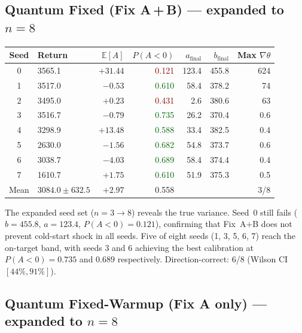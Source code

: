 \documentclass[10pt,a4paper]{article}
\begin{document}
\subsection{Quantum Fixed (Fix A\,+\,B) — expanded to $n=8$}

\begin{center}
\setlength{\tabcolsep}{5pt}
\begin{tabular}{clrrrrr}
\toprule
\textbf{Seed} & \textbf{Return} & $\mathbb{E}[A]$ &
  $P(A{<}0)$ & $a_\text{final}$ & $b_\text{final}$ & Max $\nabla\theta$ \\
\midrule
0 & 3565.1 & $+31.44$ & \textcolor{darkred}{0.121} & 123.4 & 455.8 & 624 \\
1 & 3517.0 & $-0.53$  & \textcolor{darkgreen}{0.610} &  58.4 & 378.2 &  74 \\
2 & 3495.0 & $+0.23$  & \textcolor{darkred}{0.431} &   2.6 & 380.6 &  63 \\
3 & 3516.7 & $-0.79$  & \textcolor{darkgreen}{0.735} &  26.2 & 370.4 & 0.6 \\
4 & 3298.9 & $+13.48$ & \textcolor{darkgreen}{0.588} &  33.4 & 382.5 & 0.4 \\
5 & 2630.0 & $-1.56$  & \textcolor{darkgreen}{0.682} &  54.8 & 373.7 & 0.6 \\
6 & 3038.7 & $-4.03$  & \textcolor{darkgreen}{0.689} &  58.4 & 374.4 & 0.4 \\
7 & 1610.7 & $+1.75$  & \textcolor{darkgreen}{0.610} &  51.9 & 375.3 & 0.5 \\
\midrule
Mean & $3084.0 \pm 632.5$ & $+2.97$ & 0.558 &
  \multicolumn{2}{r}{} & 3/8 \\
\bottomrule
\end{tabular}
\end{center}

The expanded seed set ($n=3\rightarrow 8$) reveals the true variance. Seed~0
still fails ($b=455.8$, $a=123.4$, $P(A<0)=0.121$), confirming that Fix~A+B
does not prevent cold-start shock in all seeds. Five of eight seeds (1, 3, 5, 6, 7)
reach the on-target band, with seeds 3 and 6 achieving the best calibration
at $P(A<0)=0.735$ and $0.689$ respectively. Direction-correct: 6/8 (Wilson CI
$[44\%,91\%]$).

\subsection{Quantum Fixed-Warmup (Fix A only) — expanded to $n=8$}
\end{document}
